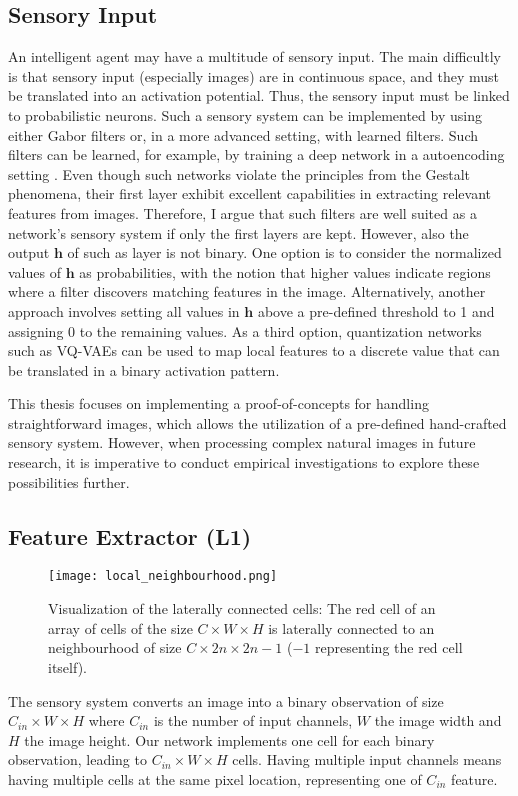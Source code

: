 \subsection{Sensory Input}
An intelligent agent may have a multitude of sensory input. The main difficultly is that sensory input (especially images) are in continuous space, and they must be translated into an activation potential.
Thus, the sensory input must be linked to probabilistic neurons. Such a sensory system can be implemented by using either Gabor filters  or, in a more advanced setting, with learned filters.
Such filters can be learned, for example, by training a deep network in a autoencoding setting . Even though such networks violate the principles from the Gestalt phenomena, their first layer exhibit excellent capabilities in extracting relevant features from images. Therefore, I argue that such filters are well suited as a network's sensory system if only the first layers are kept. However, also the output $\boldsymbol{h}$ of such as layer is not binary.
One option is to consider the normalized values of $\boldsymbol{h}$ as probabilities, with the notion that higher values indicate regions where a filter discovers matching features in the image. Alternatively, another approach involves setting all values in $\boldsymbol{h}$ above a pre-defined threshold to 1 and assigning 0 to the remaining values.
As a third option, quantization networks such as VQ-VAEs  can be used to map local features to a discrete value that can be translated in a binary activation pattern.

This thesis focuses on implementing a proof-of-concepts for handling straightforward images, which allows the utilization of a pre-defined hand-crafted sensory system. However, when processing complex natural images in future research, it is imperative to conduct empirical investigations to explore these possibilities further.

\subsection{Feature Extractor (L1)}
\begin{figure}[h]
    \centering
    \texttt{[image: local\_neighbourhood.png]}
    \caption[Laterally connected cells]{Visualization of the laterally connected cells: The red cell of an array of cells of the size $C \times W \times H$ is laterally connected to an neighbourhood of size  $C \times 2n \times 2n - 1$ ($-1$ representing the red cell itself).}
\end{figure}
The sensory system converts an image into a binary observation of size $C_{in} \times W \times H$ where $C_{in}$ is the number of input channels, $W$ the image width and $H$ the image height.
Our network implements one cell for each binary observation, leading to $C_{in} \times W \times H$ cells.
Having multiple input channels means having multiple cells at the same pixel location, representing one of $C_{in}$ feature.

